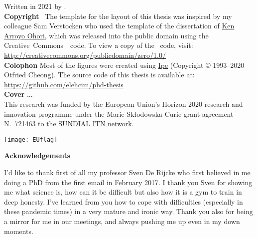\clearpage
\thispagestyle{empty}
\null%
\label{thesis:colophon}
\vfill
{}
\noindent Written in 2021 by {\makeatletter{\@author}\makeatother}.\\
\textbf{Copyright}~\cczero{} The template for the layout of this thesis was inspired by my colleague Sam Verstocken who used the template of the dissertation of \href{ken.mx}{Ken Arroyo Ohori},
which was released into the public domain using the Creative~Commons~\cczero{}~code.
To view a copy of the \cczero{}~code, visit:\\\url{http://creativecommons.org/publicdomain/zero/1.0/}\\
\textbf{Colophon}
Most of the figures were created using \href{http://ipe.otfried.org/}{Ipe} (Copyright © 1993–2020 Otfried Cheong).
The source code of this thesis is available at: \\
\url{https://github.com/elehcim/phd-thesis}\\
\textbf{Cover}
...\\[2ex]
This research was funded by the European Union's Horizon 2020 research and innovation programme under the Marie Sk\l odowska-Curie
grant agreement N.~721463 to the \href{www.astro.rug.nl/~sundial}{SUNDIAL ITN network}.
\begin{figure*}[bh!]
  \centering
  \texttt{[image: EUflag]}
\end{figure*}

\clearpage
\thispagestyle{empty}
\null%
\label{thesis:acknowledgements}
  \begin{center}
    {\Large \textbf{Acknowledgements}}\\
  \end{center}
I'd like to thank first of all my professor Sven De Rijcke who first believed in me doing a PhD from the first email in February 2017. I thank you Sven for showing me what science is, how can it be difficult but also how it is a gym to train in deep honesty. I've learned from you how to cope with difficulties (especially in these pandemic times) in a very mature and ironic way.
Thank you also for being a mirror for me in our meetings, and always pushing me up even in my down moments.

